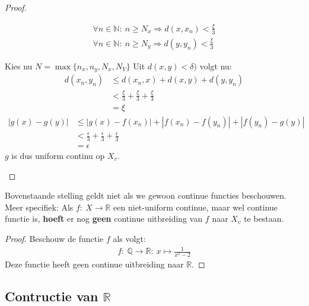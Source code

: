 \documentclass[main.tex]{subfiles}
\begin{document}
\begin{st}
\begin{proof}
\begin{itemize}
\begin{itemize}
\begin{itemize}
          \begin{align*}
            \forall n\in\mathbb{N}:\ n\ge N_{x}\Rightarrow d(x,x_{n}) < \frac{\xi}{3}\\
            \forall n\in\mathbb{N}:\ n\ge N_{y}\Rightarrow d(y,y_{n}) < \frac{\xi}{3}
          \end{align*}
        \end{itemize}
        Kies nu $N = \max\{n_{x},n_{y},N_{x},N_{Y}\}$
        Uit $d(x,y)<\delta)$ volgt nu:
        \begin{align*}
          d(x_{n},y_{n})
          &\le d(x_{n},x) + d(x,y) + d(y,y_{n})\\
          &< \frac{\xi}{3} + \frac{\xi}{3} + \frac{\xi}{3}\\
          &= \xi
        \end{align*}
        \begin{align*}
          |g(x)-g(y)|
          &\le |g(x)-f(x_{n})| + |f(x_{n})-f(y_{n})| + |f(y_{n})-g(y)|\\
          &< \frac{\epsilon}{3} + \frac{\epsilon}{3} + \frac{\epsilon}{3}\\
          &= \epsilon
        \end{align*}
        $g$ is dus uniform continu op $X_{v}$.
      \end{itemize}
    \end{itemize}
  \end{proof}
\end{st}

\begin{tvb}
  Bovenstaande stelling geldt niet als we gewoon continue functies beschouwen.
  Meer specifiek: Als $f:\ X \rightarrow \mathbb{R}$ een niet-uniform continue, maar wel continue functie is, \textbf{hoeft} er nog \textbf{geen} continue uitbreiding van $f$ naar $X_{v}$ te bestaan.

  \begin{proof}
    Beschouw de functie $f$ als volgt:
    \begin{align*}
      f:\ \mathbb{Q} \rightarrow \mathbb{R}:\ x \mapsto \frac{1}{x^{2}-2}
    \end{align*}
    Deze functie heeft geen continue uitbreiding naar $\mathbb{R}$.
  \end{proof}
\end{tvb}


\subsection{Contructie van $\mathbb{R}$}
\label{sec:contr-van-mathbbr}

\end{document}
